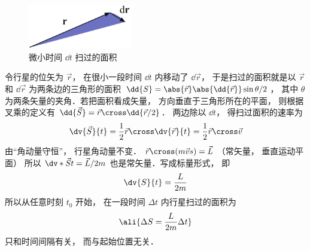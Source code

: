 
\begin{figure}[ht]
\centering
\includegraphics[width=4.5cm]{./figures/Keple21.pdf}
\caption{微小时间 $\dd{t}$ 扫过的面积} \label{Keple21}
\end{figure}

令行星的位矢为 $\vec r$，  在很小一段时间 $\dd{t}$ 内移动了 $\dd{\vec r}$，  于是扫过的面积就是以 $\vec r$ 和 $\dd{\vec r}$ 为两条边的三角形的面积 $\dd{S} = \abs{\vec r} \abs{\dd{\vec r}} \sin \theta /2 $，  其中 $\theta $ 为两条矢量的夹角．若把面积看成矢量， 方向垂直于三角形所在的平面， 则根据叉乘的定义有 $\dd{\vec S} = \vec r \cross \dd{\vec r/2}$． 两边除以 $\dd{t}$，  得扫过面积的速率为
\begin{equation}
\dv{\vec S}{t} = \frac{1}{2}\vec r \cross \dv{\vec r}{t} = \frac 12 \vec r\cross \vec v
\end{equation}
由“角动量守恒”， 行星角动量不变．
$\vec r \cross (m\vec vs) = \vec L$ （常矢量， 垂直运动平面） 所以 $\dv*{\vec S}{t} = \vec L /2m$ 也是常矢量．写成标量形式， 即
\begin{equation}
\dv{S}{t} = \frac{L}{2m}
\end{equation}
所以从任意时刻 $t_0$ 开始， 在一段时间 $\Delta t$ 内行星扫过的面积为 
\begin{equation}\ali{
\Delta S = \frac{L}{2m}\Delta t
}\end{equation}
只和时间间隔有关， 而与起始位置无关．

